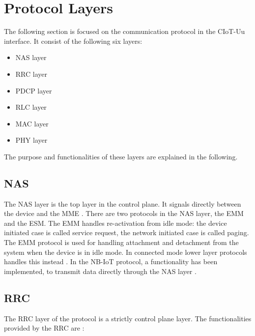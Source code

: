 \section{Protocol Layers}

The following section is focused on the communication protocol in the \gls{CIoT}-Uu interface. It consist of the following six layers:
\begin{itemize}
	\item \gls{NAS} layer
	\item \gls{RRC} layer
	\item \gls{PDCP} layer
	\item \gls{RLC} layer
	\item \gls{MAC} layer
	\item \gls{PHY} layer
\end{itemize}

The purpose and functionalities of these layers are explained in the following.

\subsection{NAS}
The \gls{NAS} layer is the top layer in the control plane. It signals directly between the device and the \gls{MME} \citep[ch. 3]{book_LTE_for_UMTS}. There are two protocols in the \gls{NAS} layer, the \gls{EMM} and the \gls{ESM}. The \gls{EMM} handles re-activation from idle mode: the device initiated case is called service request, the network initiated case is called paging. The \gls{EMM} protocol is used for handling attachment and detachment from the system when the device is in idle mode. In connected mode lower layer protocols handles this instead \citep[ch. 3]{book_LTE_for_UMTS}. In the NB-IoT protocol, a functionality has been implemented, to transmit data directly through the NAS layer \citep{REL-13}. 

\subsection{RRC} \label{sec:RRC}
The \gls{RRC} layer of the protocol is a strictly control plane layer. The functionalities provided by the \gls{RRC} are \citep[ch. 6.6]{book_LTE_for_UMTS}:

